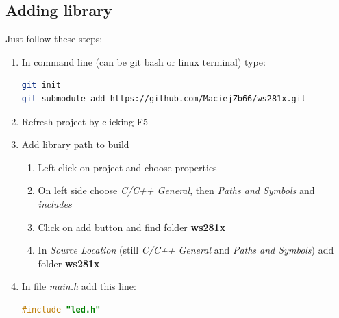 \documentclass[]{article}
\begin{document}
	\subsection{Adding library}
	Just follow these steps:
	\begin{enumerate}
		 \item In command line (can be git bash or linux terminal) type:\\
			\begin{lstlisting}[language=bash]
git init
git submodule add https://github.com/MaciejZb66/ws281x.git
\end{lstlisting}
		\item Refresh project by clicking F5
		\item Add library path to build
		\begin{enumerate}[label*=\arabic*.]
			\item Left click on project and choose properties
			\item On left side choose \textit{C/C++ General}, then \textit{Paths and Symbols} and \textit{includes}
			\item Click on add button and find folder \textbf{ws281x}
			\item In \textit{Source Location} (still \textit{C/C++ General} and \textit{Paths and Symbols}) add folder \textbf{ws281x}
		\end{enumerate}
		\item In file \textit{main.h} add this line:\\
			\begin{lstlisting}[language=C]
#include "led.h"
\end{lstlisting}
	\end{enumerate}
			
\end{document}
